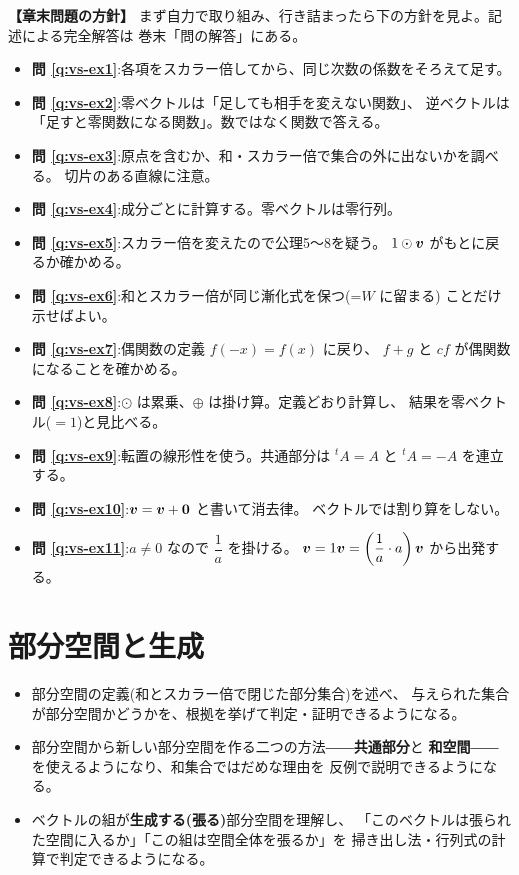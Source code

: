 \bigskip
{\small
\noindent\textbf{【章末問題の方針】}\quad
まず自力で取り組み、行き詰まったら下の方針を見よ。記述による完全解答は
巻末「問の解答」にある。
\begin{itemize}
\item \textbf{問 \ref{q:vs-ex1}}:各項をスカラー倍してから、同じ次数の係数をそろえて足す。
\item \textbf{問 \ref{q:vs-ex2}}:零ベクトルは「足しても相手を変えない関数」、
逆ベクトルは「足すと零関数になる関数」。数ではなく関数で答える。
\item \textbf{問 \ref{q:vs-ex3}}:原点を含むか、和・スカラー倍で集合の外に出ないかを調べる。
切片のある直線に注意。
\item \textbf{問 \ref{q:vs-ex4}}:成分ごとに計算する。零ベクトルは零行列。
\item \textbf{問 \ref{q:vs-ex5}}:スカラー倍を変えたので公理5〜8を疑う。
$1 \odot \bm{v}$ がもとに戻るか確かめる。
\item \textbf{問 \ref{q:vs-ex6}}:和とスカラー倍が同じ漸化式を保つ(=$W$ に留まる)
ことだけ示せばよい。
\item \textbf{問 \ref{q:vs-ex7}}:偶関数の定義 $f(-x) = f(x)$ に戻り、
$f + g$ と $cf$ が偶関数になることを確かめる。
\item \textbf{問 \ref{q:vs-ex8}}:$\odot$ は累乗、$\oplus$ は掛け算。定義どおり計算し、
結果を零ベクトル($= 1$)と見比べる。
\item \textbf{問 \ref{q:vs-ex9}}:転置の線形性を使う。共通部分は
${}^t\!A = A$ と ${}^t\!A = -A$ を連立する。
\item \textbf{問 \ref{q:vs-ex10}}:$\bm{v} = \bm{v} + \bm{0}$ と書いて消去律。
ベクトルでは割り算をしない。
\item \textbf{問 \ref{q:vs-ex11}}:$a \ne 0$ なので $\dfrac{1}{a}$ を掛ける。
$\bm{v} = 1\bm{v} = \left(\dfrac{1}{a}\cdot a\right)\bm{v}$ から出発する。
\end{itemize}
}

\chapter{部分空間と生成}\label{chap:subspace}

\begin{goal}
\begin{itemize}
\item 部分空間の定義(和とスカラー倍で閉じた部分集合)を述べ、
与えられた集合が部分空間かどうかを、根拠を挙げて判定・証明できるようになる。
\item 部分空間から新しい部分空間を作る二つの方法――\textbf{共通部分}と
\textbf{和空間}――を使えるようになり、和集合ではだめな理由を
反例で説明できるようになる。
\item ベクトルの組が\textbf{生成する(張る)}部分空間を理解し、
「このベクトルは張られた空間に入るか」「この組は空間全体を張るか」を
掃き出し法・行列式の計算で判定できるようになる。
\end{itemize}
\end{goal}

